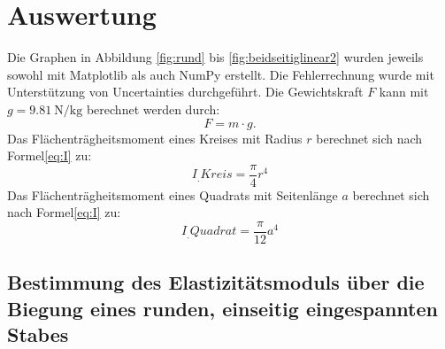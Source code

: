 
\section{Auswertung}
\label{sec:Auswertung}
Die Graphen in Abbildung \ref{fig:rund} bis \ref{fig:beidseitiglinear2} wurden jeweils sowohl mit Matplotlib \cite{matplotlib} als auch NumPy \cite{numpy} erstellt. Die Fehlerrechnung wurde mit Unterstützung von Uncertainties \cite{uncertainties} durchgeführt.\newline 
Die Gewichtskraft $F$ kann mit $g=\SI{9.81}{\newton\per\kilogram}$ \cite{g} berechnet werden durch:
\begin{equation}
	F = m \cdot g \text{.} \label{eq:F}
\end{equation}
Das Flächenträgheitsmoment eines Kreises mit Radius $r$ berechnet sich nach Formel\eqref{eq:I} zu:
\begin{equation}
	I_.{Kreis} = \frac{\pi}{4} r^4 \label{eq:I_Kreis}
\end{equation}
Das Flächenträgheitsmoment eines Quadrats mit Seitenlänge $a$ berechnet sich nach Formel\eqref{eq:I} zu:
\begin{equation}
	I_.{Quadrat} = \frac{\pi}{12} a^4 \label{eq:I_Quadrat}
\end{equation}

\subsection{Bestimmung des Elastizitätsmoduls über die Biegung eines runden, einseitig eingespannten Stabes}

